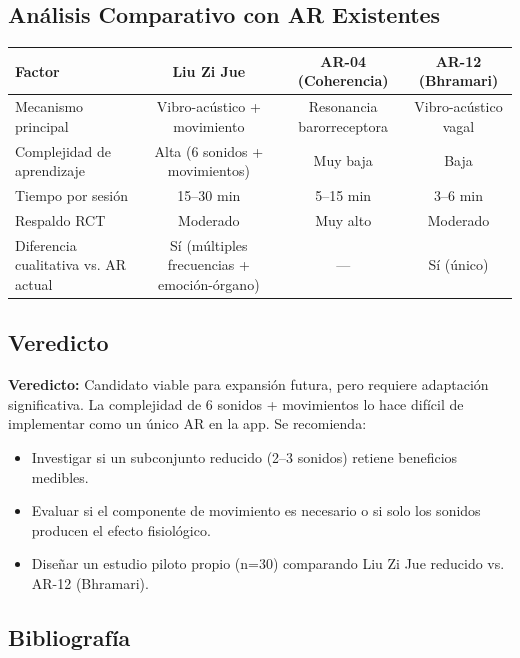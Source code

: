 \documentclass[12pt,a4paper]{article}
\newcommand{\veredicto}[1]{\textbf{Veredicto:} #1}
\begin{document}
\subsection{Análisis Comparativo con AR Existentes}

\begin{tabularx}{\textwidth}{Xccc}
    \toprule
    \textbf{Factor} & \textbf{Liu Zi Jue} & \textbf{AR-04 (Coherencia)} & \textbf{AR-12 (Bhramari)} \\
    \midrule
    Mecanismo principal & Vibro-acústico + movimiento & Resonancia barorreceptora & Vibro-acústico vagal \\
    Complejidad de aprendizaje & Alta (6 sonidos + movimientos) & Muy baja & Baja \\
    Tiempo por sesión & 15--30 min & 5--15 min & 3--6 min \\
    Respaldo RCT & Moderado & Muy alto & Moderado \\
    Diferencia cualitativa vs. AR actual & Sí (múltiples frecuencias + emoción-órgano) & --- & Sí (único) \\
    \bottomrule
\end{tabularx}

\subsection{Veredicto}

\veredicto{Candidato viable para expansión futura, pero requiere adaptación
significativa. La complejidad de 6 sonidos + movimientos lo hace difícil de
implementar como un único AR en la app. Se recomienda:}

\begin{itemize}
    \item Investigar si un subconjunto reducido (2--3 sonidos) retiene
          beneficios medibles.
    \item Evaluar si el componente de movimiento es necesario o si solo
          los sonidos producen el efecto fisiológico.
    \item Diseñar un estudio piloto propio (n=30) comparando Liu Zi Jue
          reducido vs. AR-12 (Bhramari).
\end{itemize}

\subsection{Bibliografía}
\end{document}
